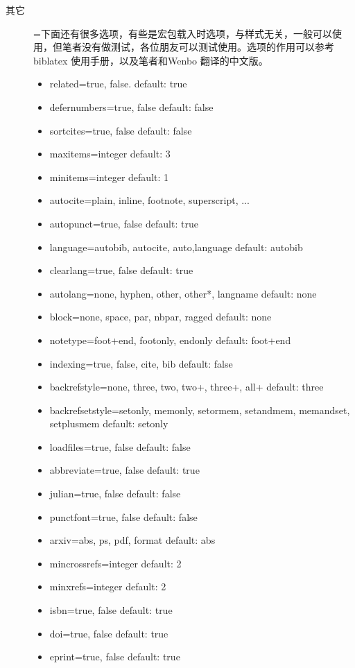 \begin{description}
  \item[其它]=下面还有很多选项，有些是宏包载入时选项，与样式无关，一般可以使用，但笔者没有做测试，各位朋友可以测试使用。选项的作用可以参考biblatex 使用手册，以及笔者和Wenbo 翻译的中文版。
      \begin{itemize}
          \item related=true, false. default: true
          \item defernumbers=true, false default: false
          \item sortcites=true, false default: false
          \item maxitems=integer default: 3
          \item minitems=integer default: 1
          \item autocite=plain, inline, footnote, superscript, ...
          \item autopunct=true, false default: true
          \item language=autobib, autocite, auto,language default: autobib
          \item clearlang=true, false default: true
          \item autolang=none, hyphen, other, other*, langname default: none
          \item block=none, space, par, nbpar, ragged default: none
          \item notetype=foot+end, footonly, endonly default: foot+end
          \item indexing=true, false, cite, bib default: false
          \item backrefstyle=none, three, two, two+, three+, all+ default: three
          \item backrefsetstyle=setonly, memonly, setormem, setandmem, memandset, setplusmem default: setonly
          \item loadfiles=true, false default: false
          \item abbreviate=true, false default: true
          \item julian=true, false default: false
          \item punctfont=true, false default: false
          \item arxiv=abs, ps, pdf, format default: abs
          \item mincrossrefs=integer default: 2
          \item minxrefs=integer default: 2
          \item isbn=true, false default: true
          \item doi=true, false default: true
          \item eprint=true, false default: true
      \end{itemize}

\end{description}



